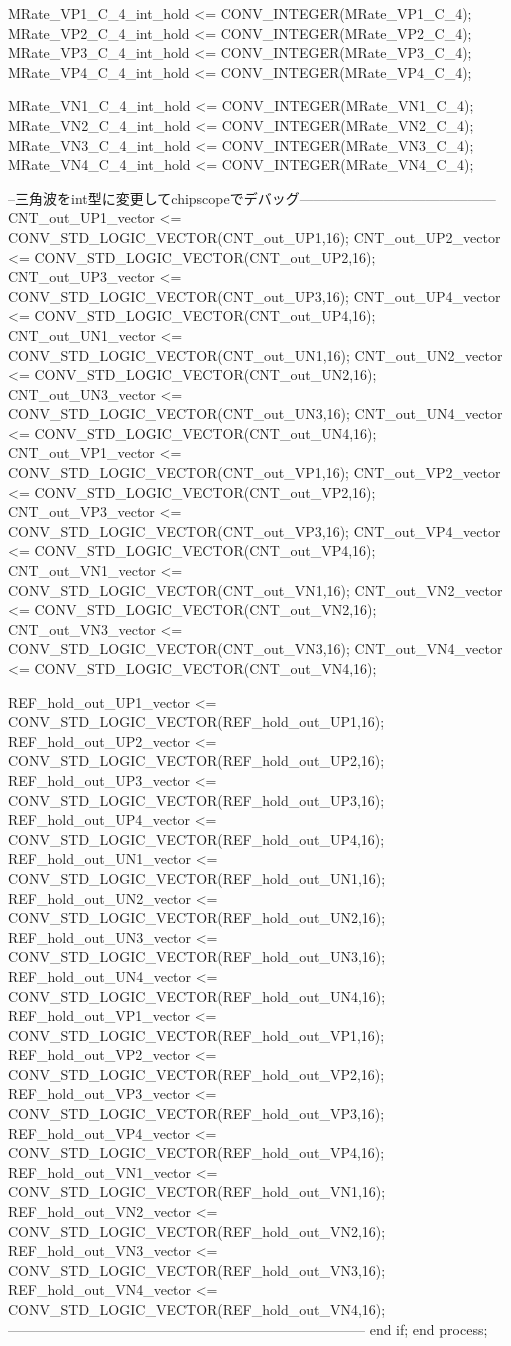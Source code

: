 \begin{mylisting}[language=VHDL,caption=ゲート信号出力モジュール,label=MMC_PWM_GEN_module_VHDL]
			MRate_VP1_C_4_int_hold <= CONV_INTEGER(MRate_VP1_C_4);
			MRate_VP2_C_4_int_hold <= CONV_INTEGER(MRate_VP2_C_4);
			MRate_VP3_C_4_int_hold <= CONV_INTEGER(MRate_VP3_C_4);
			MRate_VP4_C_4_int_hold <= CONV_INTEGER(MRate_VP4_C_4);

			MRate_VN1_C_4_int_hold <= CONV_INTEGER(MRate_VN1_C_4);
			MRate_VN2_C_4_int_hold <= CONV_INTEGER(MRate_VN2_C_4);
			MRate_VN3_C_4_int_hold <= CONV_INTEGER(MRate_VN3_C_4);
			MRate_VN4_C_4_int_hold <= CONV_INTEGER(MRate_VN4_C_4);
			
		--三角波をint型に変更してchipscopeでデバッグ------------------------------------------
			CNT_out_UP1_vector	 <= CONV_STD_LOGIC_VECTOR(CNT_out_UP1,16);
			CNT_out_UP2_vector	 <= CONV_STD_LOGIC_VECTOR(CNT_out_UP2,16);
			CNT_out_UP3_vector	 <= CONV_STD_LOGIC_VECTOR(CNT_out_UP3,16);
			CNT_out_UP4_vector	 <= CONV_STD_LOGIC_VECTOR(CNT_out_UP4,16);
			CNT_out_UN1_vector	 <= CONV_STD_LOGIC_VECTOR(CNT_out_UN1,16);
			CNT_out_UN2_vector	 <= CONV_STD_LOGIC_VECTOR(CNT_out_UN2,16);
			CNT_out_UN3_vector	 <= CONV_STD_LOGIC_VECTOR(CNT_out_UN3,16);
			CNT_out_UN4_vector	 <= CONV_STD_LOGIC_VECTOR(CNT_out_UN4,16);
			CNT_out_VP1_vector	 <= CONV_STD_LOGIC_VECTOR(CNT_out_VP1,16);
			CNT_out_VP2_vector	 <= CONV_STD_LOGIC_VECTOR(CNT_out_VP2,16);
			CNT_out_VP3_vector	 <= CONV_STD_LOGIC_VECTOR(CNT_out_VP3,16);
			CNT_out_VP4_vector	 <= CONV_STD_LOGIC_VECTOR(CNT_out_VP4,16);
			CNT_out_VN1_vector	 <= CONV_STD_LOGIC_VECTOR(CNT_out_VN1,16);
			CNT_out_VN2_vector	 <= CONV_STD_LOGIC_VECTOR(CNT_out_VN2,16);
			CNT_out_VN3_vector	 <= CONV_STD_LOGIC_VECTOR(CNT_out_VN3,16);
			CNT_out_VN4_vector	 <= CONV_STD_LOGIC_VECTOR(CNT_out_VN4,16);
			
			REF_hold_out_UP1_vector	 <= CONV_STD_LOGIC_VECTOR(REF_hold_out_UP1,16);
			REF_hold_out_UP2_vector	 <= CONV_STD_LOGIC_VECTOR(REF_hold_out_UP2,16);
			REF_hold_out_UP3_vector	 <= CONV_STD_LOGIC_VECTOR(REF_hold_out_UP3,16);
			REF_hold_out_UP4_vector	 <= CONV_STD_LOGIC_VECTOR(REF_hold_out_UP4,16);
			REF_hold_out_UN1_vector	 <= CONV_STD_LOGIC_VECTOR(REF_hold_out_UN1,16);
			REF_hold_out_UN2_vector	 <= CONV_STD_LOGIC_VECTOR(REF_hold_out_UN2,16);
			REF_hold_out_UN3_vector	 <= CONV_STD_LOGIC_VECTOR(REF_hold_out_UN3,16);
			REF_hold_out_UN4_vector	 <= CONV_STD_LOGIC_VECTOR(REF_hold_out_UN4,16);
			REF_hold_out_VP1_vector	 <= CONV_STD_LOGIC_VECTOR(REF_hold_out_VP1,16);
			REF_hold_out_VP2_vector	 <= CONV_STD_LOGIC_VECTOR(REF_hold_out_VP2,16);
			REF_hold_out_VP3_vector	 <= CONV_STD_LOGIC_VECTOR(REF_hold_out_VP3,16);
			REF_hold_out_VP4_vector	 <= CONV_STD_LOGIC_VECTOR(REF_hold_out_VP4,16);
			REF_hold_out_VN1_vector	 <= CONV_STD_LOGIC_VECTOR(REF_hold_out_VN1,16);
			REF_hold_out_VN2_vector	 <= CONV_STD_LOGIC_VECTOR(REF_hold_out_VN2,16);
			REF_hold_out_VN3_vector	 <= CONV_STD_LOGIC_VECTOR(REF_hold_out_VN3,16);
			REF_hold_out_VN4_vector	 <= CONV_STD_LOGIC_VECTOR(REF_hold_out_VN4,16);
		-----------------------------------------------------------------------------
		end if;
	end process;


\end{mylisting}
